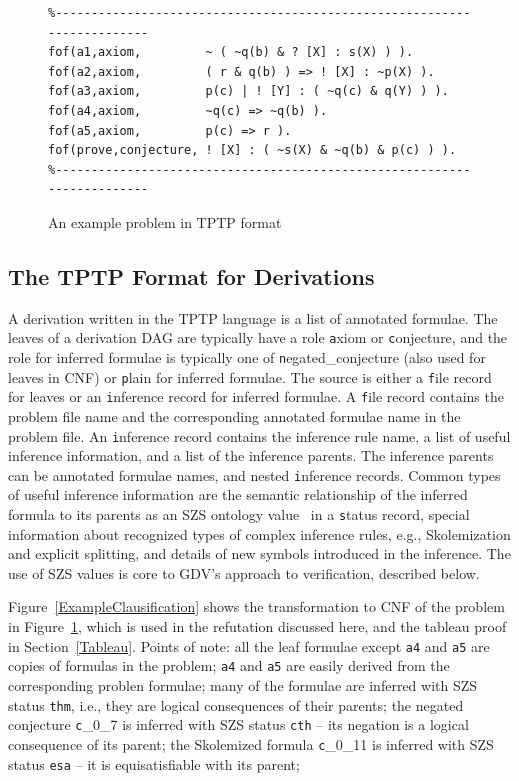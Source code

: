 \documentclass[runningheads]{llncs}
\newcommand{\smalltt}[1]{\small \texttt{#1}}
\begin{document}
\begin{figure}[htb]
\centering
{\footnotesize
{\setlength{\baselineskip}{4mm}
\begin{verbatim}
%------------------------------------------------------------------------
fof(a1,axiom,         ~ ( ~q(b) & ? [X] : s(X) ) ).
fof(a2,axiom,         ( r & q(b) ) => ! [X] : ~p(X) ).
fof(a3,axiom,         p(c) | ! [Y] : ( ~q(c) & q(Y) ) ).
fof(a4,axiom,         ~q(c) => ~q(b) ).
fof(a5,axiom,         p(c) => r ).
fof(prove,conjecture, ! [X] : ( ~s(X) & ~q(b) & p(c) ) ).
%------------------------------------------------------------------------
\end{verbatim}
}}
\caption{An example problem in TPTP format}
\label{ExampleProblem}
\end{figure}

\subsection{The TPTP Format for Derivations}
\label{Derivations}

A derivation written in the TPTP language is a list of annotated formulae. 
The leaves of a derivation DAG are typically have a role {\smalltt axiom} or {\smalltt conjecture}, 
and the role for inferred formulae is typically one of {\smalltt negated\_conjecture} (also used 
for leaves in CNF) or {\smalltt plain} for inferred formulae. 
The source is either a {\smalltt file} record for leaves or an {\smalltt inference} record for 
inferred formulae.
A {\smalltt file} record contains the problem file name and the corresponding annotated formulae 
name in the problem file.
An {\smalltt inference} record contains the inference rule name, a list of useful inference 
information, and a list of the inference parents.
The inference parents can be annotated formulae names, and nested {\smalltt inference} records.
Common types of useful inference information are the semantic relationship of the inferred formula 
to its parents as an SZS ontology value~\cite{Sut08-KEAPPA} in a {\smalltt status} record, 
special information about recognized types of complex inference rules, e.g., Skolemization and
explicit splitting, and details of new symbols introduced in the inference.
The use of SZS values is core to GDV's approach to verification, described below.

Figure~\ref{ExampleClausification} shows the transformation to CNF of the problem in 
Figure~\ref{ExampleProblem}, which is used in the refutation discussed here, and the tableau
proof in Section~\ref{Tableau}.
Points of note:
all the leaf formulae except {\tt a4} and {\tt a5} are copies of formulas in the problem;
{\tt a4} and {\tt a5} are easily derived from the corresponding problen formulae;
many of the formulae are inferred with SZS status {\smalltt{thm}}, i.e., they are logical 
consequences of their parents;
the negated conjecture {\smalltt c\_0\_7} is inferred with SZS status {\smalltt{cth}} --
its negation is a logical consequence of its parent;
the Skolemized formula {\smalltt c\_0\_11} is inferred with SZS status {\smalltt{esa}} --
it is equisatisfiable with its parent;
\end{document}
